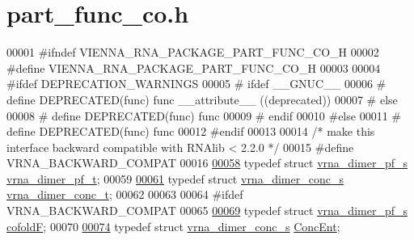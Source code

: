 \hypertarget{part__func__co_8h_source}{}\section{part\+\_\+func\+\_\+co.\+h}
\label{part__func__co_8h_source}

\begin{DoxyCode}
00001 \textcolor{preprocessor}{#ifndef VIENNA\_RNA\_PACKAGE\_PART\_FUNC\_CO\_H}
00002 \textcolor{preprocessor}{#define VIENNA\_RNA\_PACKAGE\_PART\_FUNC\_CO\_H}
00003 
00004 \textcolor{preprocessor}{#ifdef DEPRECATION\_WARNINGS}
00005 \textcolor{preprocessor}{# ifdef \_\_GNUC\_\_}
00006 \textcolor{preprocessor}{#  define DEPRECATED(func) func \_\_attribute\_\_ ((deprecated))}
00007 \textcolor{preprocessor}{# else}
00008 \textcolor{preprocessor}{#  define DEPRECATED(func) func}
00009 \textcolor{preprocessor}{# endif}
00010 \textcolor{preprocessor}{#else}
00011 \textcolor{preprocessor}{# define DEPRECATED(func) func}
00012 \textcolor{preprocessor}{#endif}
00013 
00014 \textcolor{comment}{/* make this interface backward compatible with RNAlib < 2.2.0 */}
00015 \textcolor{preprocessor}{#define VRNA\_BACKWARD\_COMPAT}
00016 
\hypertarget{part__func__co_8h_source.tex_l00058}{}\hyperlink{group__pf__cofold_ga444df1587c9a2ca15b8eb25188f629c3}{00058} \textcolor{keyword}{typedef} \textcolor{keyword}{struct }\hyperlink{group__pf__cofold_structvrna__dimer__pf__s}{vrna\_dimer\_pf\_s}  \hyperlink{group__pf__cofold_structvrna__dimer__pf__s}{vrna\_dimer\_pf\_t};
00059 
\hypertarget{part__func__co_8h_source.tex_l00061}{}\hyperlink{group__pf__cofold_gac48c2723444ecfdceafcfd525ca98322}{00061} \textcolor{keyword}{typedef} \textcolor{keyword}{struct }\hyperlink{group__pf__cofold_structvrna__dimer__conc__s}{vrna\_dimer\_conc\_s}  \hyperlink{group__pf__cofold_structvrna__dimer__conc__s}{vrna\_dimer\_conc\_t};
00062 
00063 
00064 \textcolor{preprocessor}{#ifdef VRNA\_BACKWARD\_COMPAT}
00065 
\hypertarget{part__func__co_8h_source.tex_l00069}{}\hyperlink{group__pf__cofold_ga5445d8d96a40e9e79b1fa5a7f1a6b7ea}{00069} \textcolor{keyword}{typedef} \textcolor{keyword}{struct }\hyperlink{group__pf__cofold_structvrna__dimer__pf__s}{vrna\_dimer\_pf\_s}    \hyperlink{group__pf__cofold_structvrna__dimer__pf__s}{cofoldF};
00070 
\hypertarget{part__func__co_8h_source.tex_l00074}{}\hyperlink{group__pf__cofold_ga46244c7adf5040580291c45b465f4efa}{00074} \textcolor{keyword}{typedef} \textcolor{keyword}{struct }\hyperlink{group__pf__cofold_structvrna__dimer__conc__s}{vrna\_dimer\_conc\_s}  \hyperlink{group__pf__cofold_structvrna__dimer__conc__s}{ConcEnt};

\end{DoxyCode}

